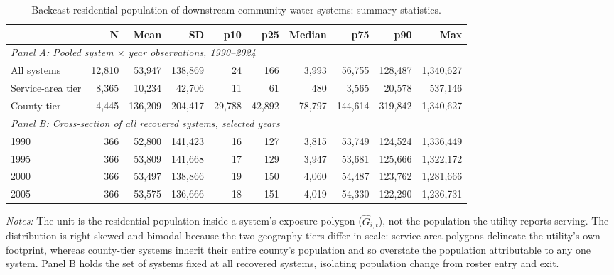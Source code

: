 \begin{table}[ht]
\centering
\caption{Backcast residential population of downstream community water systems: summary statistics.}
\label{tab:backcast_popsum}
\begin{adjustbox}{max width=\textwidth}
\begin{tabular}{lrrrrrrrrr}
\toprule
 & N & Mean & SD & p10 & p25 & Median & p75 & p90 & Max \\
\midrule
\multicolumn{10}{l}{\textit{Panel A: Pooled system $\times$ year observations, 1990--2024}} \\
All systems & 12,810 & 53,947 & 138,869 & 24 & 166 & 3,993 & 56,755 & 128,487 & 1,340,627 \\
\quad Service-area tier & 8,365 & 10,234 & 42,706 & 11 & 61 & 480 & 3,565 & 20,578 & 537,146 \\
\quad County tier & 4,445 & 136,209 & 204,417 & 29,788 & 42,892 & 78,797 & 144,614 & 319,842 & 1,340,627 \\
\midrule
\multicolumn{10}{l}{\textit{Panel B: Cross-section of all recovered systems, selected years}} \\
1990 & 366 & 52,800 & 141,423 & 16 & 127 & 3,815 & 53,749 & 124,524 & 1,336,449 \\
1995 & 366 & 53,809 & 141,668 & 17 & 129 & 3,947 & 53,681 & 125,666 & 1,322,172 \\
2000 & 366 & 53,497 & 138,866 & 19 & 150 & 4,060 & 54,487 & 123,762 & 1,281,666 \\
2005 & 366 & 53,575 & 136,666 & 18 & 151 & 4,019 & 54,330 & 122,290 & 1,236,731 \\
\bottomrule
\end{tabular}
\end{adjustbox}
\begin{minipage}{\textwidth}\footnotesize\raggedright
\vspace{0.5em}
\textit{Notes:} The unit is the residential population inside a system's exposure polygon ($\hat{G}_{i,t}$), not the population the utility reports serving. The distribution is right-skewed and bimodal because the two geography tiers differ in scale: service-area polygons delineate the utility's own footprint, whereas county-tier systems inherit their entire county's population and so overstate the population attributable to any one system. Panel B holds the set of systems fixed at all recovered systems, isolating population change from roster entry and exit.
\end{minipage}
\end{table}
